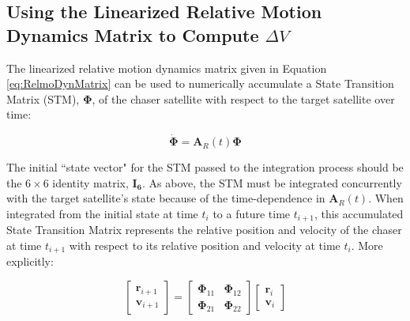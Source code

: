 \documentclass[a4paper]{article}
\begin{document}

\subsection{Using the Linearized Relative Motion Dynamics Matrix to Compute \(\Delta V\)}

The linearized relative motion dynamics matrix given in Equation \ref{eq:RelmoDynMatrix} can be used to numerically accumulate a State Transition Matrix (STM), \(\boldsymbol{\Phi}\), of the chaser satellite with respect to the target satellite over time:

\begin{equation} \label{eq:STM}
\dot{\boldsymbol{\Phi}} = \mathbf{A}_R(t)\boldsymbol{\Phi}
\end{equation}

The initial ``state vector" for the STM passed to the integration process should be the \(6\times6\) identity matrix, \(\mathbf{I_6}\).  As above, the STM must be integrated concurrently with the target satellite's state because of the time-dependence in \(\mathbf{A}_R(t)\).  When integrated from the initial state at time \(t_i\) to a future time \(t_{i+1}\), this accumulated State Transition Matrix represents the relative position and velocity of the chaser at time \(t_{i+1}\) with respect to its relative position and velocity at time \(t_i\).  More explicitly:


\begin{equation}
\begin{bmatrix}
		\mathbf{r}_{i+1} \\
		\mathbf{v}_{i+1}
		\end{bmatrix}
= 
\begin{bmatrix}
		\boldsymbol{\Phi}_{11} & \boldsymbol{\Phi}_{12} \\
		\boldsymbol{\Phi}_{21} & \boldsymbol{\Phi}_{22}
		\end{bmatrix}
\begin{bmatrix}
		\mathbf{r}_i \\
		\mathbf{v}_i
		\end{bmatrix}
\end{equation}
\end{document}
